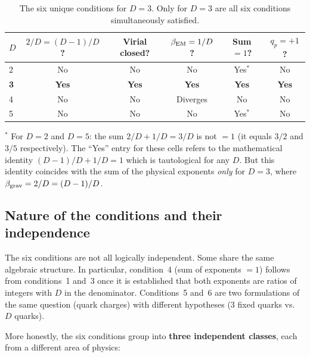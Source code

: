 \documentclass[10pt,a4paper]{article}
\begin{document}
\begin{table}[h]
\centering
\caption{The six unique conditions for $D = 3$. Only for $D = 3$ are all six conditions simultaneously satisfied.}\label{tab:D3}
\begin{tabular}{lccccc}
\toprule
$D$ & $2/D = (D-1)/D$? & Virial closed? & $\beta_{\rm EM} = 1/D$? & Sum $= 1$? & $q_p = +1$? \\
\midrule
2 & No & No & No & Yes$^*$ & No \\
\textbf{3} & \textbf{Yes} & \textbf{Yes} & \textbf{Yes} & \textbf{Yes} & \textbf{Yes} \\
4 & No & No & Diverges & No & No \\
5 & No & No & No & Yes$^*$ & No \\
\bottomrule
\end{tabular}
\end{table}

{\footnotesize $^*$ For $D = 2$ and $D = 5$: the sum $2/D + 1/D = 3/D$ is not $= 1$ (it equals $3/2$ and $3/5$ respectively). The ``Yes'' entry for these cells refers to the mathematical identity $(D-1)/D + 1/D = 1$ which is tautological for any $D$. But this identity coincides with the sum of the physical exponents \textit{only} for $D = 3$, where $\beta_{\rm grav} = 2/D = (D-1)/D$.}

\subsection{Nature of the conditions and their independence}

The six conditions are not all logically independent. Some share the same algebraic structure. In particular, condition~4 (sum of exponents $= 1$) follows from conditions~1 and~3 once it is established that both exponents are ratios of integers with $D$ in the denominator. Conditions~5 and~6 are two formulations of the same question (quark charges) with different hypotheses (3 fixed quarks vs.\ $D$ quarks).

More honestly, the six conditions group into \textbf{three independent classes}, each from a different area of physics:
\end{document}
